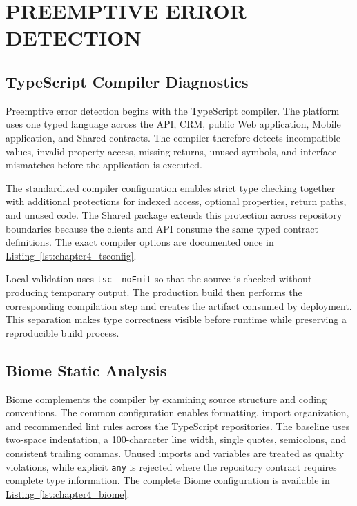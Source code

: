 \documentclass[letterpaper%
, oneside%
, 12pt%
, memoireprojet%
, english%
,creativecommons,hyperref, withAlgo2e %
]{thETS}
\begin{document}
\chapter{PREEMPTIVE ERROR DETECTION}
\label{chap:chapter5_preemptive}

\section{TypeScript Compiler Diagnostics}
Preemptive error detection begins with the TypeScript compiler. The platform uses one typed
language across the API, CRM, public Web application, Mobile application, and Shared contracts.
The compiler therefore detects incompatible values, invalid property access, missing returns, unused
symbols, and interface mismatches before the application is executed.

The standardized compiler configuration enables strict type checking together with additional
protections for indexed access, optional properties, return paths, and unused code. The Shared
package extends this protection across repository boundaries because the clients and API consume the
same typed contract definitions. The exact compiler options are documented once in
\hyperref[lst:chapter4_tsconfig]{Listing~\ref*{lst:chapter4_tsconfig}}.

Local validation uses \texttt{tsc --noEmit} so that the source is checked without producing
temporary output. The production build then performs the corresponding compilation step and creates
the artifact consumed by deployment. This separation makes type correctness visible before runtime
while preserving a reproducible build process.

\section{Biome Static Analysis}
Biome complements the compiler by examining source structure and coding conventions. The common
configuration enables formatting, import organization, and recommended lint rules across the
TypeScript repositories. The baseline uses two-space indentation, a 100-character line width,
single quotes, semicolons, and consistent trailing commas. Unused imports and variables are treated
as quality violations, while explicit \texttt{any} is rejected where the repository contract requires
complete type information. The complete Biome configuration is available in
\hyperref[lst:chapter4_biome]{Listing~\ref*{lst:chapter4_biome}}.
\end{document}
